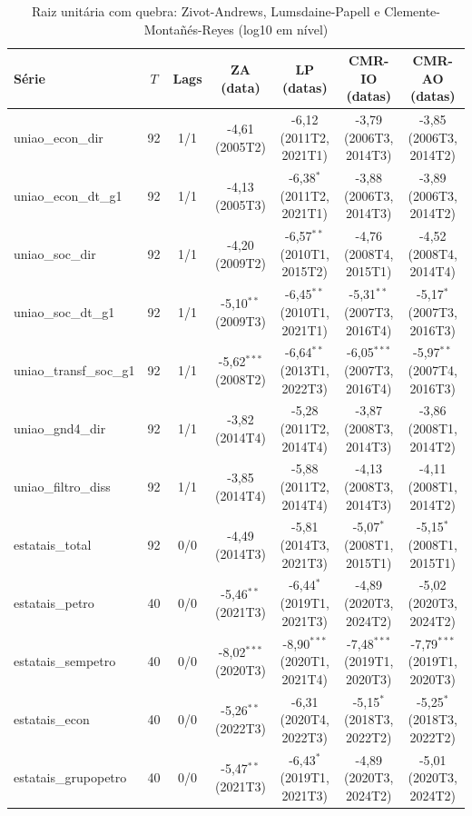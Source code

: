 \begin{table}[htbp]
\centering
\caption{Raiz unit\'aria com quebra: Zivot-Andrews, Lumsdaine-Papell e Clemente-Monta\~n\'es-Reyes (log10 em n\'ivel)}
\label{tab:a4_ur}
\tiny
\begin{tabular}{lcccccc}
\toprule
S\'erie & $T$ & Lags & ZA (data) & LP (datas) & CMR-IO (datas) & CMR-AO (datas) \\
\midrule
uniao\_econ\_dir & 92 & 1/1 & -4{,}61 (2005T2) & -6{,}12 (2011T2, 2021T1) & -3{,}79 (2006T3, 2014T3) & -3{,}85 (2006T3, 2014T2) \\
uniao\_econ\_dt\_g1 & 92 & 1/1 & -4{,}13 (2005T3) & -6{,}38$^{*}$ (2011T2, 2021T1) & -3{,}88 (2006T3, 2014T3) & -3{,}89 (2006T3, 2014T2) \\
uniao\_soc\_dir & 92 & 1/1 & -4{,}20 (2009T2) & -6{,}57$^{**}$ (2010T1, 2015T2) & -4{,}76 (2008T4, 2015T1) & -4{,}52 (2008T4, 2014T4) \\
uniao\_soc\_dt\_g1 & 92 & 1/1 & -5{,}10$^{**}$ (2009T3) & -6{,}45$^{**}$ (2010T1, 2021T1) & -5{,}31$^{**}$ (2007T3, 2016T4) & -5{,}17$^{*}$ (2007T3, 2016T3) \\
uniao\_transf\_soc\_g1 & 92 & 1/1 & -5{,}62$^{***}$ (2008T2) & -6{,}64$^{**}$ (2013T1, 2022T3) & -6{,}05$^{***}$ (2007T3, 2016T4) & -5{,}97$^{**}$ (2007T4, 2016T3) \\
uniao\_gnd4\_dir & 92 & 1/1 & -3{,}82 (2014T4) & -5{,}28 (2011T2, 2014T4) & -3{,}87 (2008T3, 2014T3) & -3{,}86 (2008T1, 2014T2) \\
uniao\_filtro\_diss & 92 & 1/1 & -3{,}85 (2014T4) & -5{,}88 (2011T2, 2014T4) & -4{,}13 (2008T3, 2014T3) & -4{,}11 (2008T1, 2014T2) \\
estatais\_total & 92 & 0/0 & -4{,}49 (2014T3) & -5{,}81 (2014T3, 2021T3) & -5{,}07$^{*}$ (2008T1, 2015T1) & -5{,}15$^{*}$ (2008T1, 2015T1) \\
estatais\_petro & 40 & 0/0 & -5{,}46$^{**}$ (2021T3) & -6{,}44$^{*}$ (2019T1, 2021T3) & -4{,}89 (2020T3, 2024T2) & -5{,}02 (2020T3, 2024T2) \\
estatais\_sempetro & 40 & 0/0 & -8{,}02$^{***}$ (2020T3) & -8{,}90$^{***}$ (2020T1, 2021T4) & -7{,}48$^{***}$ (2019T1, 2020T3) & -7{,}79$^{***}$ (2019T1, 2020T3) \\
estatais\_econ & 40 & 0/0 & -5{,}26$^{**}$ (2022T3) & -6{,}31 (2020T4, 2022T3) & -5{,}15$^{*}$ (2018T3, 2022T2) & -5{,}25$^{*}$ (2018T3, 2022T2) \\
estatais\_grupopetro & 40 & 0/0 & -5{,}47$^{**}$ (2021T3) & -6{,}43$^{*}$ (2019T1, 2021T3) & -4{,}89 (2020T3, 2024T2) & -5{,}01 (2020T3, 2024T2) \\

\end{tabular}
\end{table}
